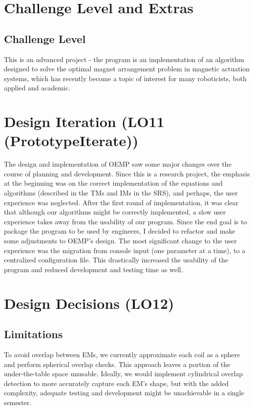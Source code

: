 \documentclass{article}
\begin{document}
\section{Challenge Level and Extras}

\subsection{Challenge Level}
This is an advanced project - the program is an implementation of an algorithm designed to solve the optimal magnet arrangement problem in magnetic actuation systems, which has recently become a topic of interest for many roboticists, both applied and academic.

\section{Design Iteration (LO11 (PrototypeIterate))}
The design and implementation of OEMP saw some major changes over the course of planning and development. Since this is a research project, the emphasis at the beginning was on the correct implementation of the equations and algorithms (described in the TMs and IMs in the SRS), and perhaps, the user experience was neglected. After the first round of implementation, it was clear that although our algorithms might be correctly implemented, a slow user experience takes away from the usability of our program. Since the end goal is to package the program to be used by engineers, I decided to refactor and make some adjustments to OEMP's design. The most significant change to the user experience was the migration from console input (one parameter at a time), to a centralized configuration file. This drastically increased the usability of the program and reduced development and testing time as well. 

\section{Design Decisions (LO12)}
\subsection{Limitations}
To avoid overlap between EMs, we currently approximate each coil as a sphere and perform spherical overlap checks. This approach leaves a portion of the under-the-table space unusable. Ideally, we would implement cylindrical overlap detection to more accurately capture each EM's shape, but with the added complexity, adequate testing and development might be unachievable in a single semester.
\end{document}
